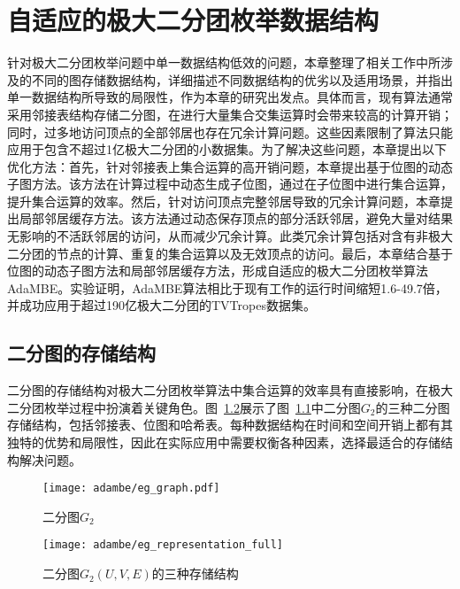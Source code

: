 \chapter{自适应的极大二分团枚举数据结构}
\label{ch:adapt_mbe}

针对极大二分团枚举问题中单一数据结构低效的问题，本章整理了相关工作中所涉及的不同的图存储数据结构，详细描述不同数据结构的优劣以及适用场景，并指出单一数据结构所导致的局限性，作为本章的研究出发点。具体而言，现有算法通常采用邻接表结构存储二分图，在进行大量集合交集运算时会带来较高的计算开销；同时，过多地访问顶点的全部邻居也存在冗余计算问题。这些因素限制了算法只能应用于包含不超过1亿极大二分团的小数据集。为了解决这些问题，本章提出以下优化方法：首先，针对邻接表上集合运算的高开销问题，本章提出基于位图的动态子图方法。该方法在计算过程中动态生成子位图，通过在子位图中进行集合运算，提升集合运算的效率。然后，针对访问顶点完整邻居导致的冗余计算问题，本章提出局部邻居缓存方法。该方法通过动态保存顶点的部分活跃邻居，避免大量对结果无影响的不活跃邻居的访问，从而减少冗余计算。此类冗余计算包括对含有非极大二分团的节点的计算、重复的集合运算以及无效顶点的访问。最后，本章结合基于位图的动态子图方法和局部邻居缓存方法，形成自适应的极大二分团枚举算法AdaMBE。实验证明，AdaMBE算法相比于现有工作的运行时间缩短1.6-49.7倍，并成功应用于超过190亿极大二分团的TVTropes数据集。

\section{二分图的存储结构}

二分图的存储结构对极大二分团枚举算法中集合运算的效率具有直接影响，在极大二分团枚举过程中扮演着关键角色。图~\ref{fig:ada_graph_format}展示了图~\ref{fig:ada_eg_tree}中二分图$G_2$的三种二分图存储结构，包括邻接表、位图和哈希表。每种数据结构在时间和空间开销上都有其独特的优势和局限性，因此在实际应用中需要权衡各种因素，选择最适合的存储结构解决问题。

\begin{figure} [H]
  \centering
  \texttt{[image: adambe/eg\_graph.pdf]}
  \caption{二分图$G_2$}
  \label{fig:ada_eg_tree}
\end{figure}


\begin{figure} [H]
	\centering
  \vspace{0.1in}
	\texttt{[image: adambe/eg\_representation\_full]}
  \vspace{0.2in}
	\caption{二分图$G_2(U,V,E)$的三种存储结构}

	\label{fig:ada_graph_format}
\end{figure}

